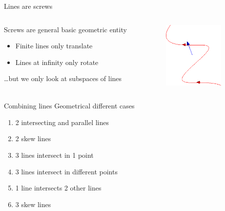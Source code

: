 \documentclass{beamer}
\begin{document}
\begin{frame}{Lines are screws}
  \begin{columns}
    \begin{column}{7cm}
      Screws are general basic geometric entity
      \begin{itemize}
        \item Finite lines only translate
        \item Lines at infinity only rotate
      \end{itemize}
      \ldots but we only look at subspaces of lines
    \end{column}
    \begin{column}{3cm}
      \begin{center}
        \includegraphics[width=3cm]{screw}
      \end{center}
    \end{column}
  \end{columns}
\end{frame}

\begin{frame}{Combining lines}
  Geometrical different cases
  \begin{enumerate}
    \item 2 intersecting and parallel lines
    \item 2 skew lines
    \item 3 lines intersect in 1 point
    \item 3 lines intersect in different points
    \item 1 line intersects 2 other lines
    \item 3 skew lines
  \end{enumerate}
\end{frame}
\end{document}
